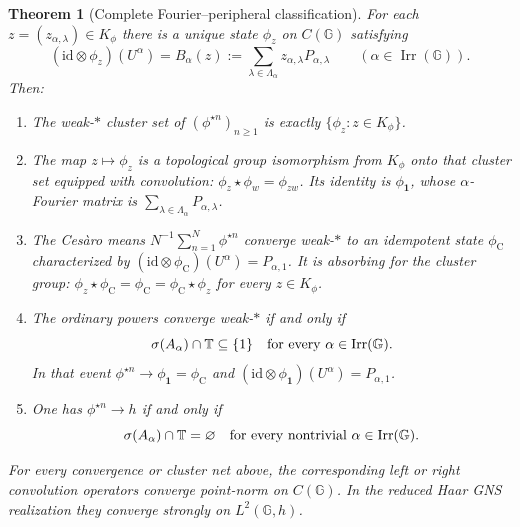 \documentclass[11pt]{article}
\newtheorem{theorem}{Theorem}
\theoremstyle{remark}
\newcommand{\T}{\mathbb T}
\newcommand{\Irr}{\operatorname{Irr}}
\newcommand{\id}{\mathrm{id}}
\begin{document}
\begin{theorem}[Complete Fourier--peripheral classification]\label{thm:main}
For each $z=(z_{\alpha,\lambda})\in K_\phi$ there is a unique state
$\phi_z$ on $C(\mathbb G)$ satisfying
\begin{equation}\label{eq:transform}
 (\id\otimes\phi_z)(U^\alpha)
 =B_\alpha(z):=
 \sum_{\lambda\in\Lambda_\alpha}
 z_{\alpha,\lambda}P_{\alpha,\lambda}
 \qquad(\alpha\in\Irr(\mathbb G)).
\end{equation}
Then:
\begin{enumerate}
\item The weak-$*$ cluster set of $(\phi^{\star n})_{n\geq1}$ is exactly
      $\{\phi_z:z\in K_\phi\}$.
\item The map $z\mapsto\phi_z$ is a topological group isomorphism from
      $K_\phi$ onto that cluster set equipped with convolution:
      $\phi_z\star\phi_w=\phi_{zw}$.  Its identity is
      $\phi_{\mathbf1}$, whose $\alpha$-Fourier matrix is
      $\sum_{\lambda\in\Lambda_\alpha}P_{\alpha,\lambda}$.
\item The Ces\`aro means $N^{-1}\sum_{n=1}^N\phi^{\star n}$ converge
      weak-$*$ to an idempotent state $\phi_{\mathrm C}$ characterized by
      $(\id\otimes\phi_{\mathrm C})(U^\alpha)=P_{\alpha,1}$.  It is absorbing
      for the cluster group:
      $\phi_z\star\phi_{\mathrm C}=\phi_{\mathrm C}
      =\phi_{\mathrm C}\star\phi_z$ for every $z\in K_\phi$.
\item The ordinary powers converge weak-$*$ if and only if
\begin{equation}\label{eq:criterion}
       \sigma(A_\alpha)\cap\T\subseteq\{1\}
       \quad\hbox{for every }\alpha\in\Irr(\mathbb G).
\end{equation}
      In that event $\phi^{\star n}\to\phi_{\mathbf1}=\phi_{\mathrm C}$ and
      $(\id\otimes\phi_{\mathbf1})(U^\alpha)=P_{\alpha,1}$.
\item One has $\phi^{\star n}\to h$ if and only if
\begin{equation}\label{eq:haar}
       \sigma(A_\alpha)\cap\T=\varnothing
       \quad\hbox{for every nontrivial }\alpha\in\Irr(\mathbb G).
\end{equation}
\end{enumerate}
For every convergence or cluster net above, the corresponding left or right
convolution operators converge point-norm on $C(\mathbb G)$.  In the reduced
Haar GNS realization they converge strongly on $L^2(\mathbb G,h)$.
\end{theorem}
\end{document}
